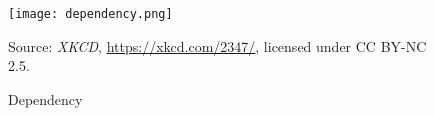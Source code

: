 \begin{figure}[h!] 
    \centering
    \texttt{[image: dependency.png]} 
    \caption{Dependency}
    \label{fig:dependency_comic}
    \small Source: \textit{XKCD}, \url{https://xkcd.com/2347/}, licensed under CC BY-NC 2.5.
\end{figure}